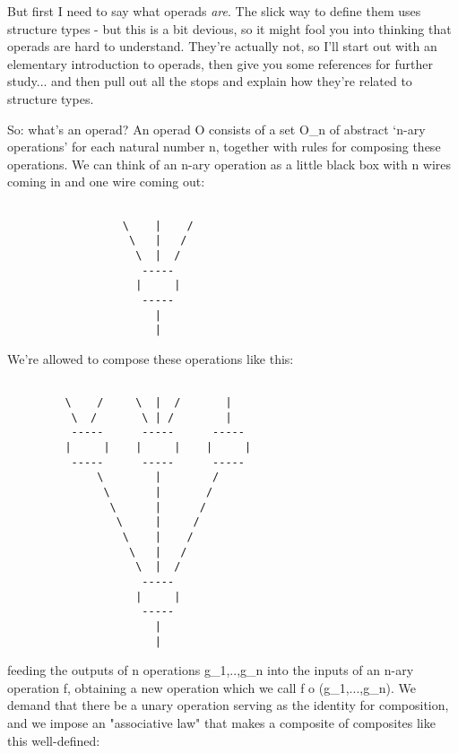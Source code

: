 But first I need to say what operads \emph{are}.  The slick way to define 
them uses structure types - but this is a bit devious, so it might
fool you into thinking that operads are hard to understand.  They're
actually not, so I'll start out with an elementary introduction to operads, 
then give you some references for further study... and then pull out all
the stops and explain how they're related to structure types.

So: what's an operad?  An operad O consists of a set O_{n} of abstract 
`n-ary operations' for each natural number n, together with rules for 
composing these operations.  We can think of an n-ary operation as a 
little black box with n wires coming in and one wire coming out:  


\begin{verbatim}

                  \    |    /
                   \   |   / 
                    \  |  /
                     -----
                    |     | 
                     -----
                       |
                       |
\end{verbatim}
    
We're allowed to compose these operations like this:


\begin{verbatim}

         \    /     \  |  /       | 
          \  /       \ | /        |
          -----      -----      -----
         |     |    |     |    |     |
          -----      -----      -----
              \        |        /  
               \       |       /
                \      |      /
                 \     |     /
                  \    |    / 
                   \   |   /  
                    \  |  /
                     -----
                    |     | 
                     -----
                       |
                       |
\end{verbatim}
    
feeding the outputs of n operations g_{1},..,g_{n} into
the inputs of an n-ary operation f, obtaining a new operation which we
call f o (g_{1},...,g_{n}).  We demand that there be a
unary operation serving as the identity for composition, and we impose
an "associative law" that makes a composite of composites like
this well-defined:



